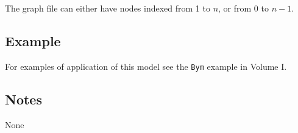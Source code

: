 \documentclass[a4paper,11pt]{article}
\begin{document}
The graph file can either have nodes indexed from 1 to $n$, or from 0
to $n-1$.

\subsection*{Example}

For examples of application of this model see the {\tt Bym} example in
Volume I.

\subsection*{Notes}

None
\end{document}
